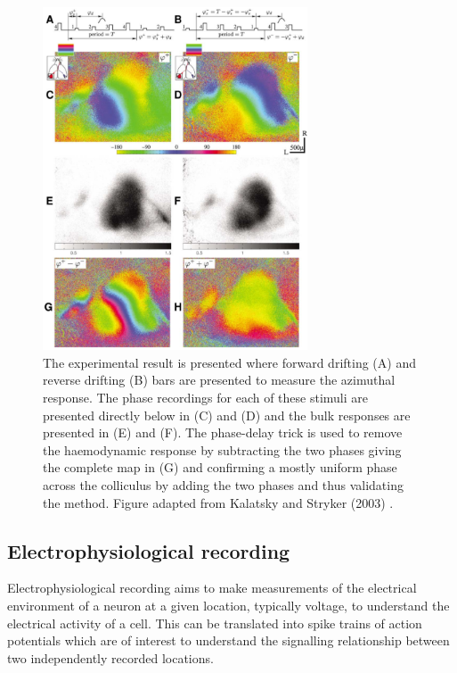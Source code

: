 \begin{figure}[h!]
	\centering
	\includegraphics[width = 0.7\textwidth]{images/introduction/kalatsky_phase}
	\def\c{The experimental result is presented where forward drifting (A) and reverse drifting (B) bars are presented to measure the azimuthal response. }
	\caption[\c]{\label{fig:ois2}  \c The phase recordings for each of these stimuli are presented directly below in (C) and (D) and the bulk responses are presented in (E) and (F). The phase-delay trick is used to remove the haemodynamic response by subtracting the two phases giving the complete map in (G) and confirming a mostly uniform phase across the colliculus by adding the two phases and thus validating the method. Figure adapted from Kalatsky and Stryker (2003) \cite{Kalatsky2003-cz}.}
\end{figure}

\subsection{Electrophysiological recording}
Electrophysiological recording aims to make measurements of the electrical environment of a neuron at a given location, typically voltage, to understand the electrical activity of a cell. This can be translated into spike trains of action potentials which are of interest to understand the signalling relationship between two independently recorded locations.

